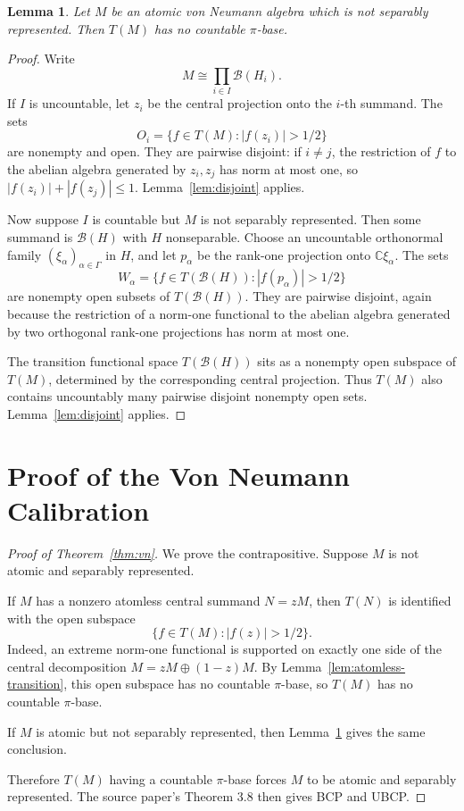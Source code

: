 \documentclass[11pt]{article}
\newtheorem{lemma}{Lemma}
\newcommand{\C}{\mathbb C}
\newcommand{\Bcal}{\mathcal B}
\begin{document}
\begin{lemma}
\label{lem:atomic-transition}
Let \(M\) be an atomic von Neumann algebra which is not separably represented.
Then \(T(M)\) has no countable \(\pi\)-base.
\end{lemma}

\begin{proof}
Write
\[
        M\cong \prod_{i\in I}\Bcal(H_i).
\]
If \(I\) is uncountable, let \(z_i\) be the central projection onto the
\(i\)-th summand.  The sets
\[
        O_i=\{f\in T(M): |f(z_i)|>1/2\}
\]
are nonempty and open.  They are pairwise disjoint: if \(i\ne j\), the
restriction of \(f\) to the abelian algebra generated by \(z_i,z_j\) has norm
at most one, so \(|f(z_i)|+|f(z_j)|\le1\).  Lemma~\ref{lem:disjoint} applies.

Now suppose \(I\) is countable but \(M\) is not separably represented.  Then
some summand is \(\Bcal(H)\) with \(H\) nonseparable.  Choose an uncountable
orthonormal family \((\xi_\alpha)_{\alpha\in\Gamma}\) in \(H\), and let
\(p_\alpha\) be the rank-one projection onto \(\C\xi_\alpha\).  The sets
\[
        W_\alpha
        =
        \{f\in T(\Bcal(H)): |f(p_\alpha)|>1/2\}
\]
are nonempty open subsets of \(T(\Bcal(H))\).  They are pairwise disjoint,
again because the restriction of a norm-one functional to the abelian
algebra generated by two orthogonal rank-one projections has norm at most
one.

The transition functional space \(T(\Bcal(H))\) sits as a nonempty open
subspace of \(T(M)\), determined by the corresponding central projection.
Thus \(T(M)\) also contains uncountably many pairwise disjoint nonempty open
sets.  Lemma~\ref{lem:disjoint} applies.
\end{proof}

\section*{Proof of the Von Neumann Calibration}

\begin{proof}[Proof of Theorem~\ref{thm:vn}]
We prove the contrapositive.  Suppose \(M\) is not atomic and separably
represented.

If \(M\) has a nonzero atomless central summand \(N=zM\), then \(T(N)\) is
identified with the open subspace
\[
        \{f\in T(M): |f(z)|>1/2\}.
\]
Indeed, an extreme norm-one functional is supported on exactly one side of
the central decomposition \(M=zM\oplus(1-z)M\).
By Lemma~\ref{lem:atomless-transition}, this open subspace has no countable
\(\pi\)-base, so \(T(M)\) has no countable \(\pi\)-base.

If \(M\) is atomic but not separably represented, then
Lemma~\ref{lem:atomic-transition} gives the same conclusion.

Therefore \(T(M)\) having a countable \(\pi\)-base forces \(M\) to be atomic
and separably represented.  The source paper's Theorem 3.8 then gives BCP
and UBCP.
\end{proof}
\end{document}
